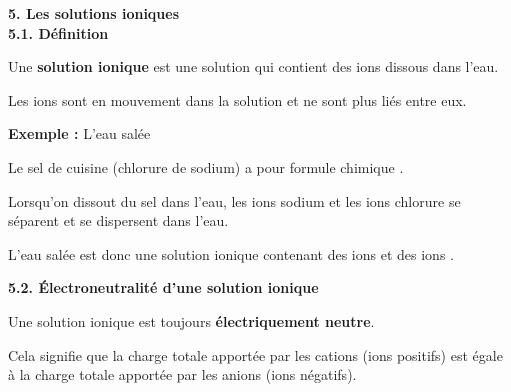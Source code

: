 \documentclass[11pt,a4paper]{article}
\begin{document}
\textbf{5. Les solutions ioniques} \\

\textbf{5.1. Définition}

\begin{tcolorbox}[colback=red!5!white,colframe=red!75!black]
{
Une \textbf{solution ionique} est une solution qui contient des ions dissous dans l'eau.

Les ions sont en mouvement dans la solution et ne sont plus liés entre eux.
}
\end{tcolorbox}



\begin{tcolorbox}[colback=red!5!white,colframe=red!75!black]
{
\textbf{Exemple : } L'eau salée

Le sel de cuisine (chlorure de sodium) a pour formule chimique .

Lorsqu'on dissout du sel dans l'eau, les ions sodium  et les ions chlorure  se séparent et se dispersent dans l'eau.

L'eau salée est donc une solution ionique contenant des ions  et des ions .
}
\end{tcolorbox}


\textbf{5.2. Électroneutralité d'une solution ionique}

\begin{tcolorbox}[colback=red!5!white,colframe=red!75!black]
{
Une solution ionique est toujours \textbf{électriquement neutre}.

Cela signifie que la charge totale apportée par les cations (ions positifs) est égale à la charge totale apportée par les anions (ions négatifs).
}
\end{tcolorbox}
\end{document}
